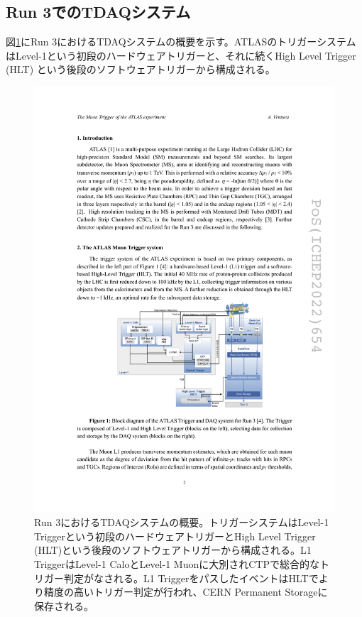     \subsection{Run 3でのTDAQシステム}
    \label{subsec_run3TDAQ}
    図\ref{Run3_TDAQ}にRun 3におけるTDAQシステムの概要を示す。ATLASのトリガーシステムはLevel-1という初段のハードウェアトリガーと、それに続くHigh Level Trigger (HLT) という後段のソフトウェアトリガーから構成される。

    \begin{figure} 
    \centering
    \includegraphics[width=16cm]{fig/Intro/Run3_TDAQ.pdf}
    \caption[Run 3におけるTDAQシステムの概要]{Run 3におけるTDAQシステムの概要\cite{Run3_TDAQ}。トリガーシステムはLevel-1 Triggerという初段のハードウェアトリガーとHigh Level Trigger (HLT)という後段のソフトウェアトリガーから構成される。L1 TriggerはLevel-1 CaloとLevel-1 Muonに大別されCTPで総合的なトリガー判定がなされる。L1 TriggerをパスしたイベントはHLTでより精度の高いトリガー判定が行われ、CERN Permanent Storageに保存される。 }
    \label{Run3_TDAQ}
    \end{figure}

